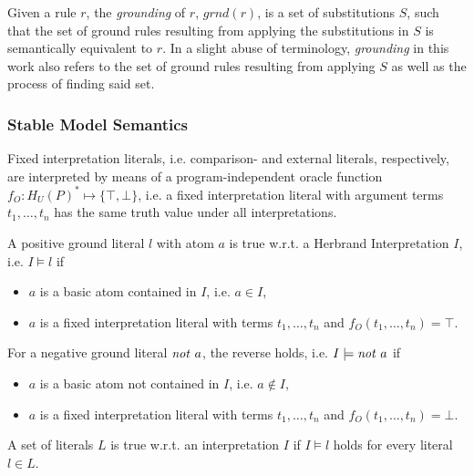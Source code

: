 \begin{definition}[Grounding]
\label{def:prelims-asp-semantics-grounding}
Given a rule $r$, the \emph{grounding} of $r$, $\mathit{grnd}(r)$, is a set of substitutions $S$, such that the set of ground rules resulting from applying the substitutions in $S$ is semantically equivalent to $r$. In a slight abuse of terminology, \emph{grounding} in this work also refers to the set of ground rules resulting from applying $S$ as well as the process of finding said set.
\end{definition}

\subsubsection{Stable Model Semantics}
\label{subsubsec:prelims-asp-semantics-stable-models}

\begin{definition}
Fixed interpretation literals, i.e. comparison- and external literals, respectively, are interpreted by means of a program-independent oracle function $f_O : H_{U}(P)^{*} \mapsto \{ \top, \bot \}$, i.e. a fixed interpretation literal with argument terms $t_1,\ldots,t_n$ has the same truth value under all interpretations.
\end{definition}

\begin{definition}
\label{def:prelims-asp-semantics-truth}
A positive ground literal $l$ with atom $a$ is true w.r.t. a Herbrand Interpretation $I$, i.e. $I \models l$ if
\begin{itemize}
	\item $a$ is a basic atom contained in $I$, i.e. $a \in I$,
	\item $a$ is a fixed interpretation literal with terms $t_1,\ldots,t_n$ and $f_O(t_1,\ldots,t_n) = \top$.
\end{itemize} 
For a negative ground literal $\NOT\ a$, the reverse holds, i.e. $I \models \mathit{not}\ a$ if
\begin{itemize}
	\item $a$ is a basic atom not contained in $I$, i.e. $a \notin I$,
	\item $a$ is a fixed interpretation literal with terms $t_1,\ldots,t_n$ and $f_O(t_1,\ldots,t_n) = \bot$.
\end{itemize} 
A set of literals $L$ is true w.r.t. an interpretation $I$ if $I \models l$ holds for every literal $l \in L$. 
\end{definition}

